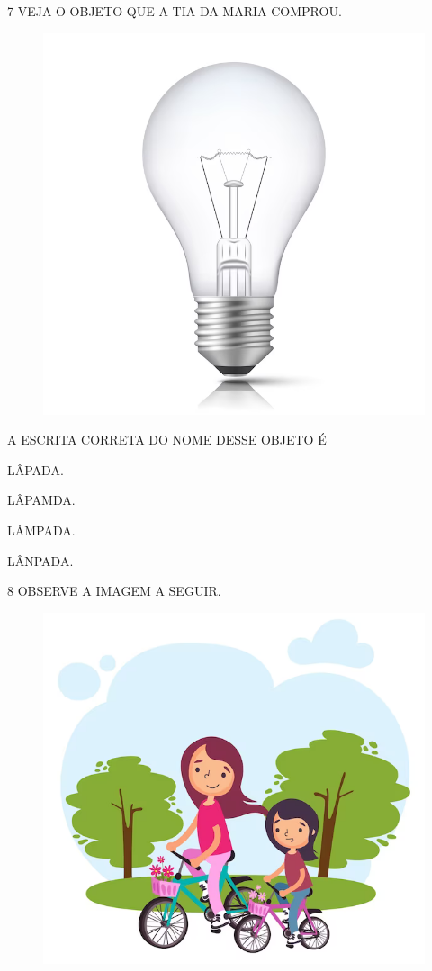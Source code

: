 \num{7} VEJA O OBJETO QUE A TIA DA MARIA COMPROU.

\begin{figure}[H]
\centering
\includegraphics[width=.6\textwidth]{./media/image240.png}
\end{figure}

A ESCRITA CORRETA DO NOME DESSE OBJETO É

\begin{escolha}

\item LÂPADA.

\item LÂPAMDA.

\item LÂMPADA.

\item LÂNPADA.

\end{escolha}

\num{8} OBSERVE A IMAGEM A SEGUIR.

\begin{figure}[H]
\centering
\includegraphics[width=.6\textwidth]{./media/image241.png}
\end{figure}

